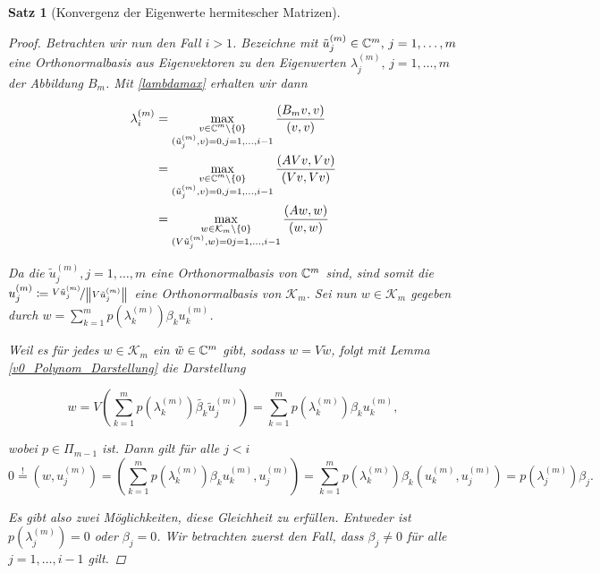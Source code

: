 \documentclass{article}
\theoremstyle{plain}
\newtheorem{theorem}    {Satz}   [section]
\begin{document}
\begin{theorem}[Konvergenz der Eigenwerte hermitescher Matrizen]
\begin{proof}
	Betrachten wir nun den Fall $i>1$.
	Bezeichne mit $\tilde{u}_j^{(m)} \in \mathbb{C}^m, \, j = 1,\dots, m$ eine Orthonormalbasis aus Eigenvektoren zu den Eigenwerten $\lambda_j^{(m)} , \, j = 1,\dots, m$ der Abbildung $B_m$. Mit \eqref{lambdamax} erhalten wir dann

	\begin{equation}
		\begin{aligned}
			\label{Darstellung EW}
			\lambda_i^{(m)} &= \max_{\substack{v\in \mathbb{C}^m\setminus \{0\} \\ (\tilde{u}_j^{(m)},v) = 0, j = 1,\dots,i-1}} \frac{(B_m v,v)}{(v,v)} \\
			&= \max_{\substack{v\in \mathbb{C}^m\setminus \{0\} \\ (\tilde{u}_j^{(m)},v) = 0, j = 1,\dots,i-1}} \frac{(AVv,Vv)}{(Vv,Vv)}\\
			&= \max_{\substack{w\in \mathcal{K}_m\setminus \{0\} \\ (V\tilde{u}_j^{(m)},w) = 0 j = 1,\dots,i-1}} \frac{(Aw,w)}{(w,w)}
		\end{aligned}
	\end{equation}

	Da die $\tilde{u}_j^{(m)}, j = 1,\dots,m$ eine Orthonormalbasis von $\mathbb{C}^m$ sind, sind somit die $u_j^{(m)} \coloneqq \nicefrac{V\tilde{u}_j^{(m)}}{{\left \| V\tilde{u}_j^{(m)} \right \|}_{}}$ eine Orthonormalbasis von $\mathcal{K}_m$. Sei nun $w\in \mathcal{K}_m$ gegeben durch $w = \sum_{k=1}^{m} p(\lambda_k^{(m)}) \beta_k u_k^{(m)}$.

	Weil es für jedes $w\in \mathcal{K}_m$ ein $\tilde{w} \in \mathbb{C}^m$ gibt, sodass $w = V \tilde{w}$, folgt mit Lemma \ref{v0_Polynom_Darstellung} die Darstellung

	\begin{equation*}
		w = V \left(\sum_{k=1}^{m} p(\lambda_k^{(m)}) \tilde{\beta_k} \tilde{u}_j^{(m)}\right) = \sum_{k=1}^{m} p(\lambda_k^{(m)}) \beta_k u_k^{(m)},
	\end{equation*}

	wobei $p \in \Pi_{m-1}$ ist.
	Dann gilt für alle $j < i$
	\begin{equation*}
		0 \stackrel{!}{=} (w,u_j^{(m)}) = (\sum_{k=1}^{m} p(\lambda_k^{(m)}) \beta_k u_k^{(m)},u_j^{(m)}) = \sum_{k=1}^{m} p(\lambda_k^{(m)}) \beta_k (u_k^{(m)},u_j^{(m)}) = p(\lambda_j^{(m)}) \beta_j.
	\end{equation*}

	Es gibt also zwei Möglichkeiten, diese Gleichheit zu erfüllen. Entweder ist $p(\lambda_j^{(m)}) = 0$ oder $\beta_j = 0$. Wir betrachten zuerst den Fall, dass  $\beta_j \neq 0$ für alle $j = 1,\dots, i-1$ gilt.


\end{proof}
\end{theorem}
\end{document}
